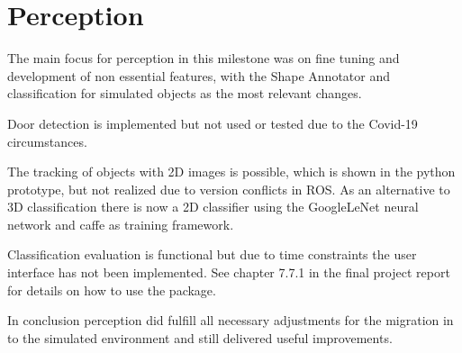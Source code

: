 \documentclass[main.tex]{subfiles}
\begin{document}
	
	\chapter{Perception}
	
The main focus for perception in this milestone was on fine tuning and development of non essential features, with the Shape Annotator and classification for simulated objects as the most relevant changes.

Door detection is implemented but not used or tested due to the Covid-19 circumstances.

The tracking of objects with 2D images is possible, which is shown in the python prototype, but not realized due to version conflicts in ROS.
As an alternative to 3D classification there is now a 2D classifier using the GoogleLeNet neural network and caffe as training framework.

Classification evaluation is functional but due to time constraints the user interface has not been implemented. See chapter 7.7.1 in the final project report for details on how to use the package.

In conclusion perception did fulfill all necessary adjustments for the migration in to the simulated environment and still delivered useful improvements.

	
\end{document}
